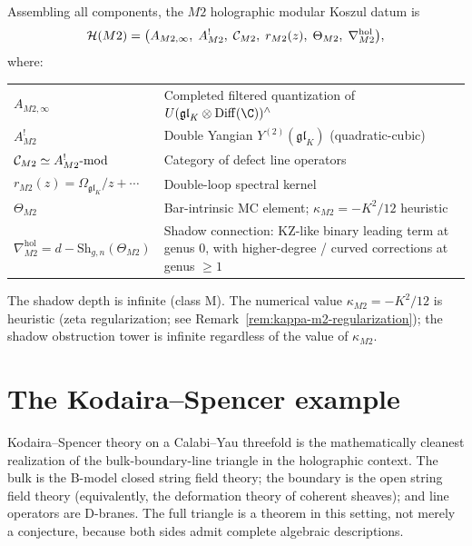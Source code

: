 \begin{computation}
Assembling all components, the $M2$ holographic modular Koszul
datum is
\begin{equation}%
\mathcal{H}(M2)
= \bigl(
A_{M2,\infty},\;
A^!_{M2},\;
\cC_{M2},\;
r_{M2}(z),\;
\Theta_{M2},\;
\nabla^{\mathrm{hol}}_{M2}
\bigr),
\end{equation}
where:
\begin{center}
\renewcommand{\arraystretch}{1.25}
\begin{tabular}{lp{9cm}}
\hline
$A_{M2,\infty}$ & Completed filtered quantization of
$U(\mathfrak{gl}_K\otimes\Diff(\C))^{\wedge}$ \\
$A^!_{M2}$ & Double Yangian
$Y^{(2)}(\mathfrak{gl}_K)$ (quadratic-cubic) \\
$\mathcal C_{M2}\simeq A^!_{M2}\text{-mod}$
& Category of defect line operators \\
$r_{M2}(z)=\Omega_{\mathfrak{gl}_K}/z+\cdots$
& Double-loop spectral kernel \\
$\Theta_{M2}$ & Bar-intrinsic MC element;
$\kappa_{M2} = -K^2/12$ heuristic \\
$\nabla^{\mathrm{hol}}_{M2}
= d - \mathrm{Sh}_{g,n}(\Theta_{M2})$
& Shadow connection: KZ-like binary leading term at genus $0$,
with higher-degree / curved corrections at genus $\ge 1$ \\
\hline
\end{tabular}
\end{center}
The shadow depth is infinite (class M). The numerical value
$\kappa_{M2} = -K^2/12$ is heuristic (zeta regularization;
see Remark~\ref{rem:kappa-m2-regularization}); the shadow obstruction tower
is infinite regardless of the value of $\kappa_{M2}$.
\end{computation}




\section{The Kodaira--Spencer example}

Kodaira--Spencer theory on a Calabi--Yau threefold is the
mathematically cleanest realization of the bulk-boundary-line
triangle in the holographic context. The bulk is the B-model
closed string field theory; the boundary is the open string field
theory (equivalently, the deformation theory of coherent sheaves);
and line operators are D-branes. The full triangle is a theorem
in this setting, not merely a conjecture, because both sides admit
complete algebraic descriptions.

